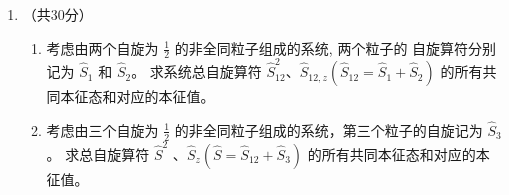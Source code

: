 \begin{enumerate}
\item 
（共30分）
\begin{enumerate}
	\item
	考虑由两个自旋为 $\frac{1}{2}$ 的非全同粒子组成的系统, 两个粒子的
	自旋算符分别记为 $\hat{S}_{1}$ 和 $\hat{S}_{2} $。 求系统总自旋算符 $\hat{S}_{12}^{2}$、$ \hat{S}_{12, z}\left(\hat{S}_{12}=\hat{S}_{1}+\hat{S}_{2}\right)$ 的所有共同本征态和对应的本征值。
	\item 
	考虑由三个自旋为 $\frac{1}{2}$ 的非全同粒子组成的系统，第三个粒子的自旋记为 $\hat{S}_{3}$ 。 求总自旋算符 $\hat{S}^{2}$ 、$ \hat{S}_{z}\left(\hat{S}=\hat{S}_{12}+\hat{S}_{3}\right)$ 的所有共同本征态和对应的本征值。
	
	
\end{enumerate}



\end{enumerate}
